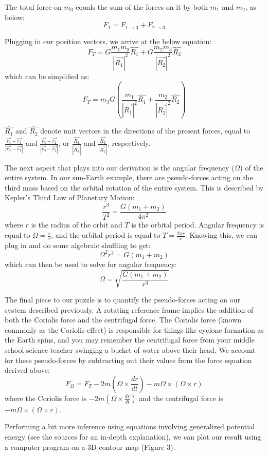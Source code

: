The total force on $m_3$ equals the sum of the forces on it by both $m_1$ and $m_2$, as below: 
\[F_T=F_{1\rightarrow3} + F_{2\rightarrow3}\]

Plugging in our position vectors, we arrive at the below equation:
\[F_T=G\frac{m_1m_3}{|\vec{R_1}|^2}\hat{R_1}+G\frac{m_2m_3}{|\vec{R_2}|^2}\hat{R_2}\]
which can be simplified as:
\[F_T=m_3G(\frac{m_1}{|\vec{R_1}|^2}\hat{R_1}+\frac{m_2}{|\vec{R_2}|^2}\hat{R_2})\]

$\hat{R_1}$ and $\hat{R_2}$ denote unit vectors in the directions of the present forces, equal to $\frac{\vec{r_3}-\vec{r_1}}{|\vec{r_3}-\vec{r_1}|}$ and $\frac{\vec{r_3}-\vec{r_2}}{|\vec{r_3}-\vec{r_2}|}$, or $\frac{\vec{R_1}}{|\vec{R_1}|}$ and $\frac{\vec{R_2}}{|\vec{R_2}|}$, respectively. 

The next aspect that plays into our derivation is the angular frequency ($\Omega$) of the entire system. In our sun-Earth example, there are pseudo-forces acting on the third mass based on the orbital rotation of the entire system. This is described by Kepler’s Third Law of Planetary Motion:
\[\frac{r^3}{T^2}=\frac{G(m_1+m_2)}{4\pi^2}\]
where $r$ is the radius of the orbit and $T$ is the orbital period. Angular frequency is equal to $\Omega=\frac{v}{r}$, and the orbital period is equal to $T=\frac{2\pi r}{v}$. Knowing this, we can plug in and do some algebraic shuffling to get:
\[\Omega^2r^3=G(m_1+m_2)\]
which can then be used to solve for angular frequency:
\[\Omega=\sqrt{\frac{G(m_1+m_2)}{r^3}}\]

The final piece to our puzzle is to quantify the pseudo-forces acting on our system described previously. A rotating reference frame implies the addition of both the Coriolis force and the centrifugal force. The Coriolis force (known commonly as the Coriolis effect) is responsible for things like cyclone formation as the Earth spins, and you may remember the centrifugal force from your middle school science teacher swinging a bucket of water above their head. We account for these pseudo-forces by subtracting out their values from the force equation derived above:
\[F_{\Omega}=F_T-2m(\Omega\times\frac{dr}{dt})-m\Omega\times(\Omega\times r)\]
where the Coriolis force is $-2m(\Omega\times\frac{dr}{dt})$ and the centrifugal force is $-m\Omega\times(\Omega\times r)$.

Performing a bit more inference using equations involving generalized potential energy (see the sources for an in-depth explanation), we can plot our result using a computer program on a 3D contour map (Figure 3).

